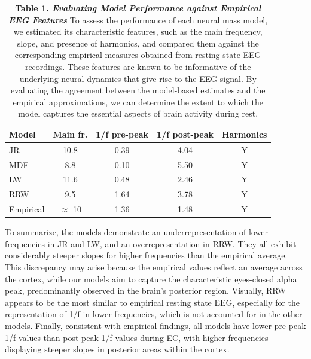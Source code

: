 \documentclass[12pt,twoside]{article}
\begin{document}
\begin{table}

\footnotesize
\centering %
\begin{tabular}{l c c c c} %
\hline\hline   
Model & Main fr. & 1/f pre-peak & 1/f post-peak & Harmonics 
\\ 
\hline   
 JR & 10.8 & 0.39 & 4.04 & Y \\
 MDF & 8.8 & 0.10 & 5.50 & Y \\
LW & 11.6 & 0.48 & 2.46 & Y \\
RRW & 9.5 & 1.64 & 3.78 & Y \\
\hline\hline %
Empirical & $\approx$ 10 & 1.36 & 1.48 & Y\\
\hline
\end{tabular}  
\caption*{\textbf{Table 1. \textit{Evaluating Model Performance against Empirical EEG Features}}  To assess the performance of each neural mass model, we estimated its characteristic features, such as the main frequency, slope, and presence of harmonics, and compared them against the corresponding empirical measures obtained from resting state EEG recordings. These features are known to be informative of the underlying neural dynamics that give rise to the EEG signal. By evaluating the agreement between the model-based estimates and the empirical approximations, we can determine the extent to which the model captures the essential aspects of brain activity during rest.}  
\end{table}




To summarize, the models demonstrate an underrepresentation of lower frequencies in JR and LW, and an overrepresentation in RRW. They all exhibit considerably steeper slopes for higher frequencies than the empirical average. This discrepancy may arise because the empirical values reflect an average across the cortex, while our models aim to capture the characteristic eyes-closed alpha peak, predominantly observed in the brain's posterior region. Visually, RRW appears to be the most similar to empirical resting state EEG, especially for the representation of 1/f in lower frequencies, which is not accounted for in the other models. Finally, consistent with empirical findings, all models have lower pre-peak 1/f values than post-peak 1/f values during EC, with higher frequencies displaying steeper slopes in posterior areas within the cortex.  %
\end{document}

